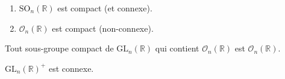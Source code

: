 
  \begin{proposition}
    \begin{enumerate}[label=(\roman*)]
      \item $\mathrm{SO}_n(\mathbb{R})$ est compact (et connexe).
      \item $\mathcal{O}_n(\mathbb{R})$ est compact (non-connexe).
    \end{enumerate}
  \end{proposition}


  \begin{proposition}
    Tout sous-groupe compact de $\mathrm{GL}_n(\mathbb{R})$ qui contient $\mathcal{O}_n(\mathbb{R})$ est $\mathcal{O}_n(\mathbb{R})$.
  \end{proposition}


  \begin{proposition}
    $\mathrm{GL}_n(\mathbb{R})^+$ est connexe.
  \end{proposition}

